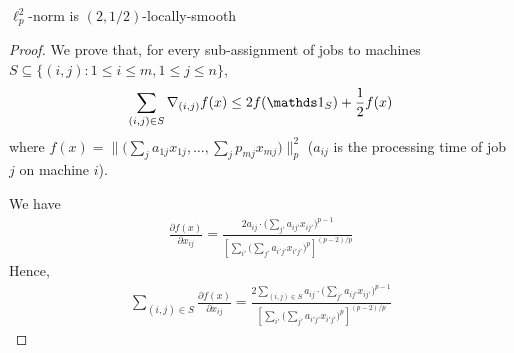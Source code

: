 \begin{lemma} \label{lem-makespan}
$\ell_{p}^{2}$-norm is $(2,1/2)$-locally-smooth
\end{lemma}
%
\begin{proof}
We prove that, for every sub-assignment of jobs to machines $S \subseteq \{(i,j): 1 \leq i \leq m, 1 \leq j \leq n\}$,
%
\begin{align}	\label{ineq:lp-smooth}
\sum_{(i,j) \in S} \nabla_{(i,j)} f(x) \leq 2 f(\one_{S}) + \frac{1}{2} f(x)
\end{align}
where $f(x) = \| \bigl( \sum_{j} a_{1j} x_{1j}, \ldots, \sum_{j} p_{mj} x_{mj} \bigr)\|_{p}^{2}$
($a_{ij}$ is the processing time of job $j$ on machine $i$).


We have
%
\begin{align*}
\frac{\partial f(x)}{\partial x_{ij}}
= \frac{2a_{ij} \cdot \bigl( \sum_{j'} a_{ij'} x_{ij'} \bigr)^{p-1} }{ \left[ \sum_{i'} \bigl( \sum_{j'} a_{i'j'} x_{i'j'} \bigr)^{p} \right]^{(p-2)/p}}
\end{align*}
Hence,
\begin{align*}
\sum_{(i,j) \in S} \frac{\partial f(x)}{\partial x_{ij}}
= \frac{ 2 \sum_{(i,j) \in S} a_{ij} \cdot \bigl( \sum_{j'} a_{ij'} x_{ij'} \bigr)^{p-1} }{ \left[ \sum_{i'} \bigl( \sum_{j'} a_{i'j'} x_{i'j'} \bigr)^{p} \right]^{(p-2)/p}}
\end{align*}


\end{proof}
